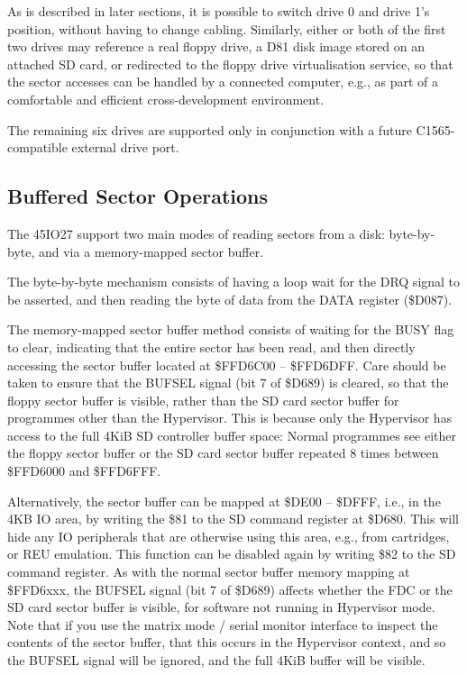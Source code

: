 As is described in later sections, it is possible to switch drive 0
and drive 1's position, without having to change cabling. Similarly,
either or both of the first two drives may reference a real floppy
drive, a D81 disk image stored on an attached SD card, or redirected
to the floppy drive virtualisation service, so that the sector
accesses can be handled by a connected computer, e.g., as part of a
comfortable and efficient cross-development environment.

The remaining six drives are supported only in conjunction with a
future C1565-compatible external drive port.

\subsection{Buffered Sector Operations}
\label{subsec:reading-from-disks-and-buffer-management}

The 45IO27 support two main modes of reading sectors from a
disk: byte-by-byte, and via a memory-mapped sector buffer.

The byte-by-byte mechanism consists of having a loop wait for the DRQ
signal to be asserted, and then reading the byte of data from the DATA
register (\$D087).

The memory-mapped sector buffer method consists of waiting for the
BUSY flag to clear, indicating that the entire sector has been read,
and then directly accessing the sector buffer located at \$FFD6C00 --
\$FFD6DFF. Care should be taken to ensure that the BUFSEL signal (bit 7 of \$D689) is
cleared, so that the floppy sector buffer is visible, rather than the
SD card sector buffer for programmes other than the Hypervisor. This
is because only the Hypervisor has access to the full 4KiB SD
controller buffer space: Normal programmes see either the floppy
sector buffer or the SD card sector buffer repeated 8 times between
\$FFD6000 and \$FFD6FFF.

Alternatively, the sector buffer can be mapped at \$DE00 -- \$DFFF,
i.e., in the 4KB IO area, by writing the \$81 to the SD command
register at \$D680.  This will hide any IO peripherals that are
otherwise using this area, e.g., from cartridges, or REU emulation.
This function can be disabled again by writing \$82 to the SD command
register. As with the normal sector buffer memory mapping at
\$FFD6xxx, the BUFSEL signal (bit 7 of \$D689) affects whether the FDC
or the SD card sector buffer is visible, for software not running in
Hypervisor mode.  Note that if you use the matrix mode / serial monitor
interface to inspect the contents of the sector buffer, that this occurs
in the Hypervisor context, and so the BUFSEL signal will be ignored,
and the full 4KiB buffer will be visible.

